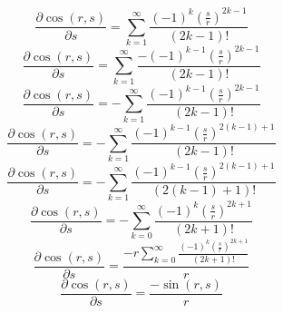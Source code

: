 \documentclass[a4paper,12pt]{report}
\begin{document}
\begin{equation}
\frac{\partial \cos(r,s)}{\partial s} = \sum \limits_{k=1}^{\infty} \frac{(-1)^k \left(\frac{s}{r}\right)^{2k-1}}{(2k-1)!}
\end{equation}
\begin{equation}
\frac{\partial \cos(r,s)}{\partial s} = \sum \limits_{k=1}^{\infty} \frac{-(-1)^{k-1} \left(\frac{s}{r}\right)^{2k-1}}{(2k-1)!}
\end{equation}
\begin{equation}
\frac{\partial \cos(r,s)}{\partial s} = -\sum \limits_{k=1}^{\infty} \frac{(-1)^{k-1} \left(\frac{s}{r}\right)^{2k-1}}{(2k-1)!}
\end{equation}
\begin{equation}
\frac{\partial \cos(r,s)}{\partial s} = -\sum \limits_{k=1}^{\infty} \frac{(-1)^{k-1} \left(\frac{s}{r}\right)^{2(k-1)+1}}{(2k-1)!}
\end{equation}
\begin{equation}
\frac{\partial \cos(r,s)}{\partial s} = -\sum \limits_{k=1}^{\infty} \frac{(-1)^{k-1} \left(\frac{s}{r}\right)^{2(k-1)+1}}{(2(k-1)+1)!}
\end{equation}
\begin{equation}
\frac{\partial \cos(r,s)}{\partial s} = -\sum \limits_{k=0}^{\infty} \frac{(-1)^k \left(\frac{s}{r}\right)^{2k+1}}{(2k+1)!}
\end{equation}
\begin{equation}
\frac{\partial \cos(r,s)}{\partial s} = \frac{-r \sum \limits_{k=0}^{\infty} \frac{(-1)^k \left(\frac{s}{r}\right)^{2k+1}}{(2k+1)!}}{r}
\end{equation}
\begin{equation}
\frac{\partial \cos(r,s)}{\partial s} = \frac{-\sin(r,s)}{r}
\end{equation}
\end{document}
